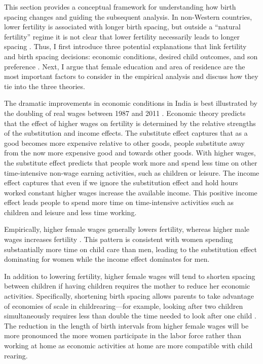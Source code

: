 This section provides a conceptual framework for understanding how birth spacing changes
and guiding the subsequent analysis.
In non-Western countries, lower fertility is associated with longer birth spacing, but 
outside a ``natural fertility'' regime it is not clear that lower fertility necessarily 
leads to longer spacing \citet{Newman1988,Rutstein2011,Casterline2016}.
Thus, I first introduce three potential explanations that link fertility and birth 
spacing decisions: economic conditions, desired child outcomes, and son preference 
\citep{Casterline2016,Portner2018}.
Next, I argue that female education and area of residence are the most important factors 
to consider in the empirical analysis and discuss how they tie into the three theories.


The dramatic improvements in economic conditions in India is best illustrated by the 
doubling of real wages between 1987 and 2011 \citep{Klasen2015}.
Economic theory predicts that the effect of higher wages on fertility is determined by 
the relative strengths of the substitution and income effects.
The substitute effect captures that as a good becomes more expensive relative to other
goods, people substitute away from the now more expensive good and towards other goods.
With higher wages, the substitute effect predicts that people work more and spend less 
time on other time-intensive non-wage earning activities, such as children or leisure.
The income effect captures that even if we ignore the substitution effect and hold hours 
worked constant higher wages increase the available income. 
This positive income effect leads people to spend more time on time-intensive activities 
such as children and leisure and less time working.

Empirically, higher female wages generally lowers fertility, whereas higher male 
wages increases fertility \citet{Hotz1997,schultz97}.
This pattern is consistent with women spending substantially more time on child care 
than men, leading to the substitution effect dominating for women while the income
effect dominates for men.

In addition to lowering fertility, higher female wages will tend to shorten spacing between 
children if having children requires the mother to reduce her economic activities.
Specifically, shortening birth spacing allows parents to take advantage of economies of 
scale in childrearing---for example, looking after two children simultaneously requires 
less than double the time needed to look after one child \citep{Vijverberg1982,Hotz1997}.
The reduction in the length of birth intervals from higher female wages will be more 
pronounced the more women participate in the labor force rather than working at home as 
economic activities at home are more compatible with child rearing.


